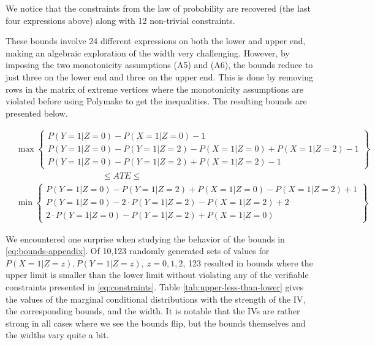 \documentclass[AMA,STIX1COL,]{WileyNJD-v2}
\begin{document}
We notice that the constraints from the law of probability are recovered
(the last four expressions above) along with 12 non-trivial constraints.

These bounds involve 24 different expressions on both the lower and
upper end, making an algebraic exploration of the width very
challenging. However, by imposing the two monotonicity assumptions (A5)
and (A6), the bounds reduce to just three on the lower end and three on
the upper end. This is done by removing rows in the matrix of extreme
vertices where the monotonicity assumptions are violated before using
Polymake to get the inequalities. The resulting bounds are presented
below.

\[
  \begin{aligned}
    &\max
      \begin{Bmatrix}
        P(Y = 1 | Z = 0) - P(X = 1 | Z = 0) - 1 \\
        P(Y = 1 | Z = 0) - P(Y = 1 | Z = 2) - P(X = 1 | Z = 0) + P(X = 1 | Z = 2) - 1 \\
        P(Y = 1 | Z = 0) - P(Y = 1 | Z = 2) + P(X = 1 | Z = 2) - 1
      \end{Bmatrix} \\
    &\qquad \qquad \qquad \qquad \qquad\le ATE \le \\
    &\min
      \begin{Bmatrix}
        P(Y = 1 | Z = 0) - P(Y = 1 | Z = 2) + P(X = 1 | Z = 0) - P(X = 1 | Z = 2) + 1\\
        P(Y = 1 | Z = 0) - 2\cdot P(Y = 1 | Z = 2) - P(X = 1 | Z = 2) + 2 \\
        2\cdot P(Y = 1 | Z = 0) - P(Y = 1 | Z = 2) + P(X = 1 | Z = 0)
      \end{Bmatrix}
  \end{aligned}
\]

We encountered one surprise when studying the behavior of the bounds in
\eqref{eq:bounds-appendix}. Of 10,123 randomly generated sets of values
for \(P(X = 1 | Z = z), P(Y = 1 | Z = z),\ z = 0,1,2\), 123 resulted in
bounds where the upper limit is smaller than the lower limit without
violating any of the verifiable constraints presented in
\eqref{eq:constraints}. Table \ref{tab:upper-less-than-lower} gives the
values of the marginal conditional distributions with the strength of
the IV, the corresponding bounds, and the width. It is notable that the
IVs are rather strong in all cases where we see the bounds flip, but the
bounds themselves and the widths vary quite a bit.
\end{document}
